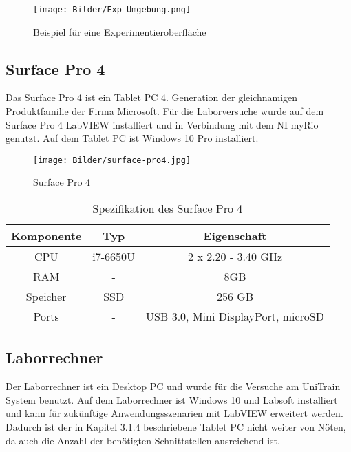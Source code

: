 \begin{figure}[H]
	\centering
	\texttt{[image: Bilder/Exp-Umgebung.png]} %
	\caption{Beispiel für eine Experimentieroberfläche}
	\label{fig: Beispiel für eine Experimentieroberfläche}
\end{figure}


\subsection{Surface Pro 4}

Das Surface Pro 4 ist ein Tablet PC 4. Generation der gleichnamigen Produktfamilie der Firma Microsoft. Für die Laborversuche wurde auf dem Surface Pro 4 LabVIEW installiert und in Verbindung mit dem NI myRio genutzt. Auf dem Tablet PC ist Windows 10 Pro installiert.

\begin{figure}[H]
	\centering
	\texttt{[image: Bilder/surface-pro4.jpg]} 
	\caption{Surface Pro 4 \cite{notebookcheck}\\}
	\label{fig: Surface}
\end{figure}


\begin{table}[h]
	\centering
	\begin{tabular}{c|c|c}
		\hline
		Komponente & Typ & Eigenschaft\\ \hline
		CPU & i7-6650U & 2 x 2.20 - 3.40 GHz\\
		RAM& - & 8GB\\
		Speicher &     SSD  &    256 GB    \\
		Ports  &     -   &       USB 3.0, Mini DisplayPort, microSD     \\
		\hline
	\end{tabular}
	\caption{Spezifikation des Surface Pro 4}
	\label{x}
\end{table}

\subsection{Laborrechner}

Der Laborrechner ist ein Desktop PC und wurde für die Versuche am UniTrain System benutzt. Auf dem Laborrechner ist Windows 10 und Labsoft installiert und kann für zukünftige Anwendungsszenarien mit LabVIEW erweitert werden. Dadurch ist der in Kapitel 3.1.4 beschriebene Tablet PC nicht weiter von Nöten, da auch die Anzahl der benötigten Schnittstellen ausreichend ist.

